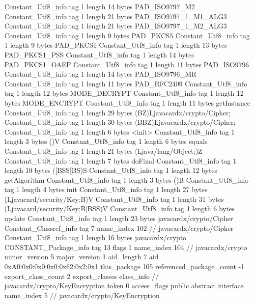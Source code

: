 {{{		}
		Constant_Utf8_info {
			tag	1
			length	14
			bytes	PAD_ISO9797_M2
		}
		Constant_Utf8_info {
			tag	1
			length	21
			bytes	PAD_ISO9797_1_M1_ALG3
		}
		Constant_Utf8_info {
			tag	1
			length	21
			bytes	PAD_ISO9797_1_M2_ALG3
		}
		Constant_Utf8_info {
			tag	1
			length	9
			bytes	PAD_PKCS5
		}
		Constant_Utf8_info {
			tag	1
			length	9
			bytes	PAD_PKCS1
		}
		Constant_Utf8_info {
			tag	1
			length	13
			bytes	PAD_PKCS1_PSS
		}
		Constant_Utf8_info {
			tag	1
			length	14
			bytes	PAD_PKCS1_OAEP
		}
		Constant_Utf8_info {
			tag	1
			length	11
			bytes	PAD_ISO9796
		}
		Constant_Utf8_info {
			tag	1
			length	14
			bytes	PAD_ISO9796_MR
		}
		Constant_Utf8_info {
			tag	1
			length	11
			bytes	PAD_RFC2409
		}
		Constant_Utf8_info {
			tag	1
			length	12
			bytes	MODE_DECRYPT
		}
		Constant_Utf8_info {
			tag	1
			length	12
			bytes	MODE_ENCRYPT
		}
		Constant_Utf8_info {
			tag	1
			length	11
			bytes	getInstance
		}
		Constant_Utf8_info {
			tag	1
			length	29
			bytes	(BZ)Ljavacardx/crypto/Cipher;
		}
		Constant_Utf8_info {
			tag	1
			length	30
			bytes	(BBZ)Ljavacardx/crypto/Cipher;
		}
		Constant_Utf8_info {
			tag	1
			length	6
			bytes	<init>
		}
		Constant_Utf8_info {
			tag	1
			length	3
			bytes	()V
		}
		Constant_Utf8_info {
			tag	1
			length	6
			bytes	equals
		}
		Constant_Utf8_info {
			tag	1
			length	21
			bytes	(Ljava/lang/Object;)Z
		}
		Constant_Utf8_info {
			tag	1
			length	7
			bytes	doFinal
		}
		Constant_Utf8_info {
			tag	1
			length	10
			bytes	([BSS[BS)S
		}
		Constant_Utf8_info {
			tag	1
			length	12
			bytes	getAlgorithm
		}
		Constant_Utf8_info {
			tag	1
			length	3
			bytes	()B
		}
		Constant_Utf8_info {
			tag	1
			length	4
			bytes	init
		}
		Constant_Utf8_info {
			tag	1
			length	27
			bytes	(Ljavacard/security/Key;B)V
		}
		Constant_Utf8_info {
			tag	1
			length	31
			bytes	(Ljavacard/security/Key;B[BSS)V
		}
		Constant_Utf8_info {
			tag	1
			length	6
			bytes	update
		}
		Constant_Utf8_info {
			tag	1
			length	23
			bytes	javacardx/crypto/Cipher
		}
		Constant_Classref_info {
			tag	7
			name_index	102		// javacardx/crypto/Cipher
		}
		Constant_Utf8_info {
			tag	1
			length	16
			bytes	javacardx/crypto
		}
		CONSTANT_Package_info {
			tag	13
			flags	1
			name_index	104		// javacardx/crypto
			minor_version	5
			major_version	1
			aid_length	7
			aid	0xA0:0x0:0x0:0x0:0x62:0x2:0x1
		}
	}
	this_package	105
	referenced_package_count	-1
	export_class_count	2
	export_classes {
		class_info {		// javacardx/crypto/KeyEncryption
			token	0
			access_flags	public abstract interface
			name_index	5		// javacardx/crypto/KeyEncryption
}}}
